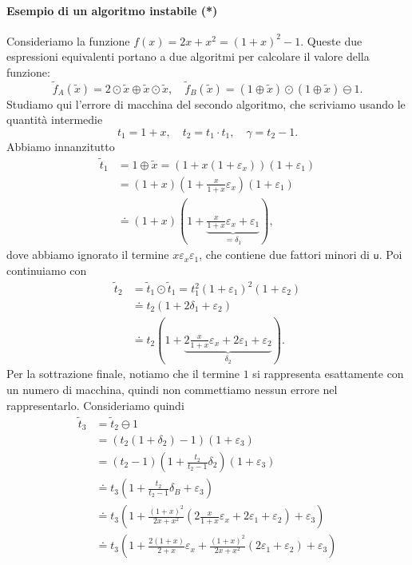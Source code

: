 \documentclass[a4paper]{report}
\theoremstyle{definition}
\theoremstyle{remark}
\begin{document}
\paragraph{Esempio di un algoritmo instabile (*)}
Consideriamo la funzione $f(x) = 2x+x^2 = (1+x)^2-1$. Queste due espressioni equivalenti portano a due algoritmi per calcolare il valore della funzione:
\[
\tilde{f}_A(\tilde{x}) = 2\odot \tilde{x} \oplus \tilde{x}\odot \tilde{x}, \quad \tilde{f}_B(\tilde{x}) = (1\oplus \tilde{x}) \odot (1\oplus \tilde{x}) \ominus 1.
\]
Studiamo qui l'errore di macchina del secondo algoritmo, che scriviamo usando le quantità intermedie
\[
t_1 = 1+x, \quad t_2 = t_1 \cdot t_1, \quad \gamma = t_2-1.
\]
Abbiamo innanzitutto
\begin{align*}
    \tilde{t}_1 &= 1\oplus\tilde{x} = (1+x(1+\varepsilon_x))(1+\varepsilon_1)\\
    &= (1+x) \left(1+\frac{x}{1+x}\varepsilon_x \right)(1+\varepsilon_1)\\
    &\doteq (1+x) \left(1+\underbrace{\frac{x}{1+x}\varepsilon_x +\varepsilon_1}_{=\delta_1}\right),
\end{align*}
dove abbiamo ignorato il termine $x\varepsilon_x\varepsilon_1$, che contiene due fattori minori di $\mathsf{u}$.
Poi continuiamo con
\begin{align*}
    \tilde{t}_2 &= \tilde{t}_1 \odot \tilde{t}_1 = t_1^2(1+\varepsilon_1)^2 (1+\varepsilon_2)\\
        &\doteq t_2(1+2\delta_1+\varepsilon_2)\\
        &\doteq t_2\left(1+ \underbrace{2\frac{x}{1+x}\varepsilon_x + 2\varepsilon_1 + \varepsilon_2}_{\delta_2}\right).
\end{align*}
Per la sottrazione finale, notiamo che il termine $1$ si rappresenta esattamente con un numero di macchina, quindi non commettiamo nessun errore nel rappresentarlo. Consideriamo quindi
\begin{align*}
    \tilde{t}_3 &= \tilde{t}_2 \ominus 1 \\
    &= (t_2(1+\delta_2) - 1)(1+\varepsilon_3)\\
    &= (t_2-1)\left(1+\frac{t_2}{t_2-1}\delta_2\right)(1+\varepsilon_3)\\
    &\doteq t_3\left(1+\frac{t_2}{t_2-1}\delta_B +\varepsilon_3\right)\\
    &\doteq t_3\left(1+ \frac{(1+x)^2}{2x+x^2}\left(2\frac{x}{1+x}\varepsilon_x + 2\varepsilon_1 + \varepsilon_2\right) +\varepsilon_3 \right)\\
    &\doteq t_3\left(1+ \frac{2(1+x)}{2+x}\varepsilon_x + \frac{(1+x)^2}{2x+x^2}(2\varepsilon_1+\varepsilon_2) +\varepsilon_3  \right)
\end{align*}
\end{document}
